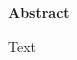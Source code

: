 \documentclass[../../main.tex]{subfiles}
\begin{document}
\begin{center}
	\bf\large Abstract
\end{center}


Text

	
\end{document}
